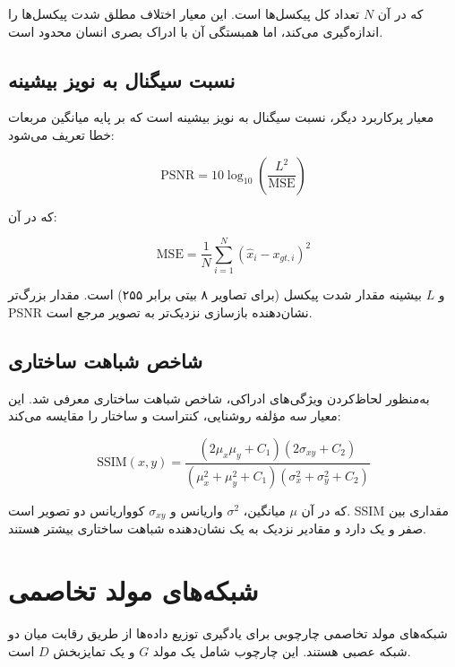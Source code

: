 که در آن $N$ تعداد کل پیکسل‌ها است. این معیار اختلاف مطلق شدت پیکسل‌ها را اندازه‌گیری می‌کند، اما همبستگی آن با ادراک بصری انسان محدود است.

\subsection{نسبت سیگنال به نویز بیشینه}

معیار پرکاربرد دیگر، نسبت سیگنال به نویز بیشینه است که بر پایه میانگین مربعات خطا تعریف می‌شود:

\begin{equation}
	\text{PSNR} =
	10 \log_{10}
	\left(
	\frac{L^2}{\text{MSE}}
	\right)
\end{equation}

که در آن:

\begin{equation}
	\text{MSE} =
	\frac{1}{N}
	\sum_{i=1}^{N}
	\left(
	\hat{x}_i - x_{gt,i}
	\right)^2
\end{equation}

و $L$ بیشینه مقدار شدت پیکسل (برای تصاویر ۸ بیتی برابر ۲۵۵) است. مقدار بزرگ‌تر PSNR نشان‌دهنده بازسازی نزدیک‌تر به تصویر مرجع است.

\subsection{شاخص شباهت ساختاری}

به‌منظور لحاظ‌کردن ویژگی‌های ادراکی، شاخص شباهت ساختاری معرفی شد. این معیار سه مؤلفه روشنایی، کنتراست و ساختار را مقایسه می‌کند:

\begin{equation}
	\text{SSIM}(x,y) =
	\frac{(2\mu_x \mu_y + C_1)(2\sigma_{xy} + C_2)}
	{(\mu_x^2 + \mu_y^2 + C_1)(\sigma_x^2 + \sigma_y^2 + C_2)}
\end{equation}

که در آن $\mu$ میانگین، $\sigma^2$ واریانس و $\sigma_{xy}$ کوواریانس دو تصویر است. SSIM مقداری بین صفر و یک دارد و مقادیر نزدیک به یک نشان‌دهنده شباهت ساختاری بیشتر هستند.

\section{شبکه‌های مولد تخاصمی}

شبکه‌های مولد تخاصمی چارچوبی برای یادگیری توزیع داده‌ها از طریق رقابت میان دو شبکه عصبی هستند. این چارچوب شامل یک مولد $G$ و یک تمایزبخش $D$ است.

